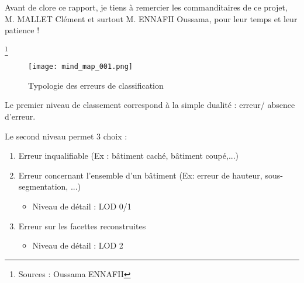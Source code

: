 \documentclass{themeensg}
\begin{document}
Avant de clore ce rapport, je tiens à remercier les commanditaires de ce projet, M. MALLET Clément et surtout M. ENNAFII Oussama, pour leur temps et leur patience !

\newpage
\listoffigures


\begin{appendices} 
\label{beginappendices}
\label{annexeerreurs}
\footnote{Sources : Oussama ENNAFII}
\begin{figure}[!h]
	\begin{center}
		\texttt{[image: mind\_map\_001.png]}  \\
		\caption[Typologie des erreurs de classification]{Typologie des erreurs de classification}
		\label{fig:example}
	\end{center}
\end{figure}


\noindent Le premier niveau de classement correspond à la simple dualité : erreur/ absence d'erreur.\newline

\noindent Le second niveau permet 3 choix : 
\begin{enumerate}
	\item Erreur inqualifiable (Ex : bâtiment caché, bâtiment coupé,...)
	\item Erreur concernant l'ensemble d'un bâtiment (Ex: erreur de hauteur, sous-segmentation, ...)
	\begin{itemize}[label=$\rightarrow$]
		\item Niveau de détail : LOD 0/1
	\end{itemize}
	\item Erreur sur les facettes reconstruites
	\begin{itemize}[label=$\rightarrow$]
		\item Niveau de détail : LOD 2
	\end{itemize}
\end{enumerate}

\end{appendices} 
\end{document}
